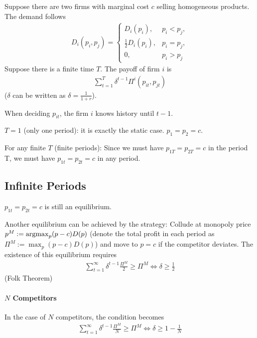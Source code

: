 \documentclass[11pt]{elegantbook}
\newcommand{\argmax}{\operatornamewithlimits{argmax}}
\begin{document}
Suppose there are two firms with marginal cost $c$ selling homogeneous products. The demand follows
\begin{equation}
    \begin{aligned}
        D_i(p_i,p_j)=\left\{\begin{matrix}
            D_i(p_i),& p_i<p_j,\\
            \frac{1}{2}D_i(p_i),& p_i=p_j,\\
            0,& p_i>p_j
        \end{matrix}\right.
    \end{aligned}
    \nonumber
\end{equation}
Suppose there is a finite time $T$. The payoff of firm $i$ is
\begin{equation}
    \begin{aligned}
        \sum_{t=1}^T\delta^{t-1} \Pi^i(p_{it},p_{jt})
    \end{aligned}
    \nonumber
\end{equation}
($\delta$ can be written as $\delta=\frac{1}{1+r}$).

When deciding $p_{it}$, the firm $i$ knows history until $t-1$.

$T=1$ (only one period): it is exactly the static case. $p_1=p_2=c$.

For any finite $T$ (finite periods): Since we must have $p_{1T}=p_{2T}=c$ in the period T, we must have $p_{1t}=p_{2t}=c$ in any period.

\subsection{Infinite Periods}
$p_{1t}=p_{2t}=c$ is still an equilibrium.

Another equilibrium can be achieved by the strategy: Collude at monopoly price $p^M:=\argmax_{p}(p-c)D(p)$ (denote the total profit in each period as $\Pi^M:=\max_{p}(p-c)D(p)$) and move to $p=c$ if the competitor deviates. The existence of this equilibrium requires
\begin{equation}
    \begin{aligned}
        \sum_{t=1}^\infty\delta^{t-1}\frac{\Pi^M}{2}\geq \Pi^M
        \Leftrightarrow \delta\geq \frac{1}{2}
    \end{aligned}
    \nonumber
\end{equation}
(Folk Theorem)

\paragraph*{$N$ Competitors}
In the case of $N$ competitors, the condition becomes
\begin{equation}
    \begin{aligned}
        \sum_{t=1}^\infty\delta^{t-1}\frac{\Pi^M}{N}\geq \Pi^M
        \Leftrightarrow \delta\geq 1-\frac{1}{N}
    \end{aligned}
    \nonumber
\end{equation}
\end{document}
